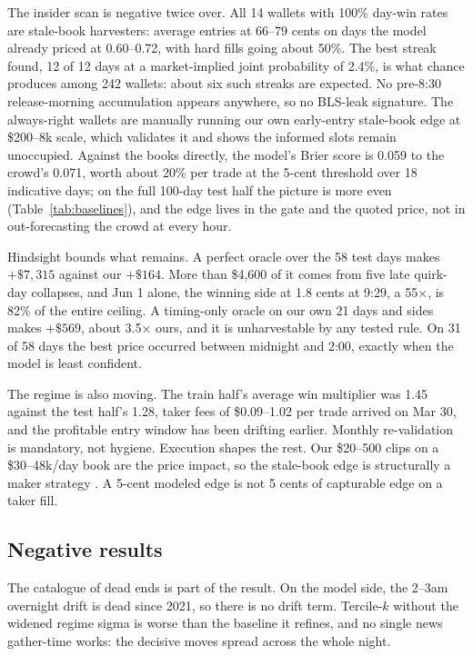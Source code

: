 The insider scan is negative twice over. All 14 wallets with 100\%
day-win rates are stale-book harvesters: average entries at 66--79 cents
on days the model already priced at 0.60--0.72, with hard fills going
about 50\%. The best streak found, 12 of 12 days at a market-implied
joint probability of 2.4\%, is what chance produces among 242 wallets:
about six such streaks are expected. No pre-8:30 release-morning
accumulation appears anywhere, so no BLS-leak signature. The always-right
wallets are manually running our own early-entry stale-book edge at
\$200--8k scale, which validates it and shows the informed slots remain
unoccupied. Against the books directly, the model's Brier score is 0.059
to the crowd's 0.071, worth about 20\% per trade at the 5-cent threshold
over 18 indicative days; on the full 100-day test half the picture is more
even (Table~\ref{tab:baselines}), and the edge lives in the gate and the
quoted price, not in out-forecasting the crowd at every hour.

Hindsight bounds what remains. A perfect oracle over the 58 test days
makes $+\$7{,}315$ against our $+\$164$. More than \$4{,}600 of it comes
from five late quirk-day collapses, and Jun 1 alone, the winning side
at 1.8 cents at 9:29, a 55$\times$, is 82\% of the entire ceiling. A
timing-only oracle on our own 21 days and sides makes $+\$569$, about
3.5$\times$ ours, and it is unharvestable by any tested rule. On 31 of 58
days the best price occurred between midnight and 2:00, exactly when the
model is least confident.

The regime is also moving. The train half's average win multiplier was
1.45 against the test half's 1.28, taker fees of \$0.09--1.02 per trade
arrived on Mar 30, and the profitable entry window has been drifting
earlier. Monthly re-validation is mandatory, not hygiene. Execution
shapes the rest. Our \$20--500 clips on a \$30--48k/day book are the
price impact, so the stale-book edge is structurally a maker strategy
\citep{polymarket2026orders}. A 5-cent modeled edge is not 5 cents of
capturable edge on a taker fill.

\subsection{Negative results}
\label{app:market_negatives}

The catalogue of dead ends is part of the result. On the model side, the
2--3am overnight drift is dead since 2021, so there is no drift term.
Tercile-$k$ without the widened regime sigma is worse than the baseline
it refines, and no single news gather-time works: the decisive moves
spread across the whole night.

